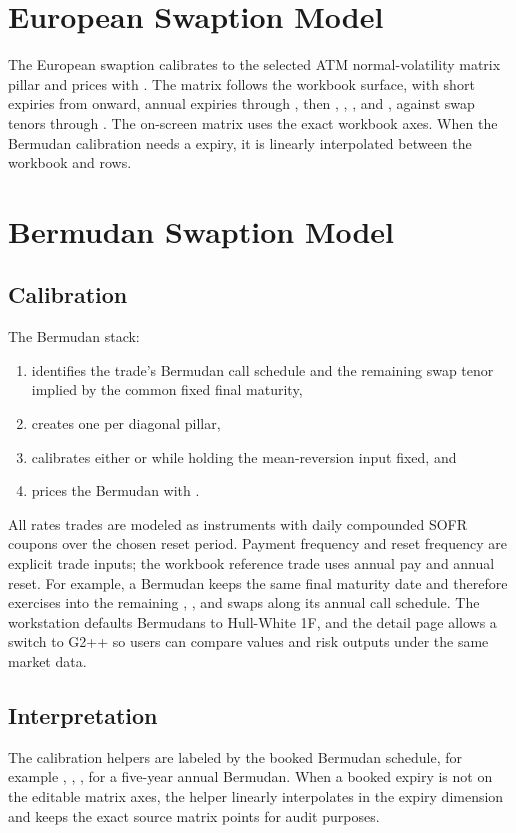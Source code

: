 \documentclass[11pt]{article}
\begin{document}
\section{European Swaption Model}
The European swaption calibrates  to the selected ATM normal-volatility matrix pillar and prices with . The matrix follows the workbook surface, with short expiries from  onward, annual expiries through , then , , , and , against swap tenors through . The on-screen matrix uses the exact workbook axes. When the Bermudan calibration needs a  expiry, it is linearly interpolated between the workbook  and  rows.

\section{Bermudan Swaption Model}
\subsection{Calibration}
The Bermudan stack:
\begin{enumerate}[leftmargin=1.5em]
    \item identifies the trade's Bermudan call schedule and the remaining swap tenor implied by the common fixed final maturity,
    \item creates one  per diagonal pillar,
    \item calibrates either  or  while holding the mean-reversion input fixed, and
    \item prices the Bermudan with .
\end{enumerate}
All rates trades are modeled as  instruments with daily compounded SOFR coupons over the chosen reset period. Payment frequency and reset frequency are explicit trade inputs; the workbook reference trade uses annual pay and annual reset.
For example, a  Bermudan keeps the same final maturity date and therefore exercises into the remaining , , and  swaps along its annual call schedule.
The workstation defaults Bermudans to Hull-White 1F, and the detail page allows a switch to G2++ so users can compare values and risk outputs under the same market data.

\subsection{Interpretation}
The calibration helpers are labeled by the booked Bermudan schedule, for example , , ,  for a five-year annual Bermudan. When a booked expiry is not on the editable matrix axes, the helper linearly interpolates in the expiry dimension and keeps the exact source matrix points for audit purposes.
\end{document}
